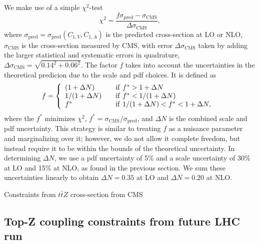 \documentclass[preprint]{JHEP3} %
\begin{document}
We make use of a simple $\chi^2$-test 
\begin{equation}
\chi^2 = \frac{f \sigma_{\mathrm{pred}} - \sigma_{\mathrm{CMS}}}{\Delta \sigma_{\mathrm{CMS}}},
\end{equation}
where $\sigma_{\mathrm{pred}}=\sigma_{\mathrm{pred}}(C_{1,V},C_{1,A})$ is the predicted cross-section at LO or NLO, 
$\sigma_{\mathrm{CMS}}$ is the cross-section measured by CMS, with error $\Delta \sigma_{\mathrm{CMS}}$ taken by adding the larger 
statistical and systematic errors in quadrature, $\Delta \sigma_{\mathrm{CMS}}=\sqrt{0.14^2+0.06^2}$. 
The factor $f$ takes into account the uncertainties in the theoretical predicion due to the scale and pdf choices. 
It is defined as \cite{Baur:2004uw,Baur:2005wi}
 \begin{equation}
f = \left\{ 
\begin{array} {l l}
(1+\Delta N)  & \quad \mathrm{if}~ f^* > 1 + \Delta N \\
1/(1+\Delta N)  & \quad \mathrm{if}~ f^* < 1/(1 + \Delta N) \\
f^* & \quad \mathrm{if}~ 1/(1 + \Delta N) < f^* < 1+\Delta N,
\end{array} \right.\ 
\end{equation}  
where the $f^*$ minimizes $\chi^2$, $f^* = \sigma_{\mathrm{CMS}} / \sigma_{\mathrm{pred}}$, and $\Delta N$ is the combined scale and pdf uncertainty. 
This strategy is similar to treating $f$ as a nuisance parameter and marginalizing over it; however, we do not allow it complete freedom, 
but instead require it to be within the bounds of the theoretical uncertainty. 
In determining $\Delta N$, we use a pdf uncertainty of 5\% and a scale uncertainty of 30\% at LO and 15\% at NLO, as found in the previous section. 
We sum these uncertainties linearly to obtain $\Delta N = 0.35$ at LO and $\Delta N = 0.20$ at NLO. 

Constraints from $t\bar{t}Z$ cross-section from CMS \\

\subsection{Top-Z coupling constraints from future LHC run}
\end{document}
